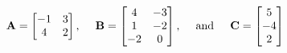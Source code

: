         \[
            \bold{A} = \begin{bmatrix}
                -1 & 3 \\
                4 & 2  
              \end{bmatrix}\text{,}\hspace{0.2in}
            \bold{B} = \begin{bmatrix}
                4  & -3 \\
                1  & -2 \\
                -2 &  0
            \end{bmatrix}\text{,}\hspace{0.2in}\text{and}\hspace{0.2in}
            \bold{C} = \begin{bmatrix}
                5 \\
                -4 \\
                2
            \end{bmatrix}
        \]
